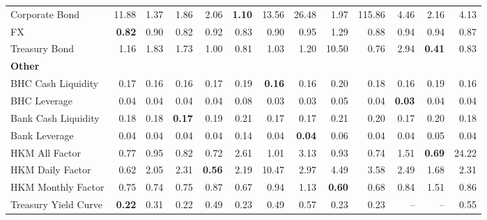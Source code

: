 \begin{table}[htbp]
\begin{tabular}{@{}lrrrrrrrrrrrr@{}}
Corporate Bond & 11.88 & 1.37 & 1.86 & 2.06 & \textbf{1.10} & 13.56 & 26.48 & 1.97 & 115.86 & 4.46 & 2.16 & 4.13 \\
FX & \textbf{0.82} & 0.90 & 0.82 & 0.92 & 0.83 & 0.90 & 0.95 & 1.29 & 0.88 & 0.94 & 0.94 & 0.87 \\
Treasury Bond & 1.16 & 1.83 & 1.73 & 1.00 & 0.81 & 1.03 & 1.20 & 10.50 & 0.76 & 2.94 & \textbf{0.41} & 0.83 \\
\midrule
\multicolumn{13}{l}{\textbf{Other}} \\
BHC Cash Liquidity & 0.17 & 0.16 & 0.16 & 0.17 & 0.19 & \textbf{0.16} & 0.16 & 0.20 & 0.18 & 0.16 & 0.19 & 0.16 \\
BHC Leverage & 0.04 & 0.04 & 0.04 & 0.04 & 0.08 & 0.03 & 0.03 & 0.05 & 0.04 & \textbf{0.03} & 0.04 & 0.04 \\
Bank Cash Liquidity & 0.18 & 0.18 & \textbf{0.17} & 0.19 & 0.21 & 0.17 & 0.17 & 0.21 & 0.20 & 0.17 & 0.20 & 0.18 \\
Bank Leverage & 0.04 & 0.04 & 0.04 & 0.04 & 0.14 & 0.04 & \textbf{0.04} & 0.06 & 0.04 & 0.04 & 0.05 & 0.04 \\
HKM All Factor & 0.77 & 0.95 & 0.82 & 0.72 & 2.61 & 1.01 & 3.13 & 0.93 & 0.74 & 1.51 & \textbf{0.69} & 24.22 \\
HKM Daily Factor & 0.62 & 2.05 & 2.31 & \textbf{0.56} & 2.19 & 10.47 & 2.97 & 4.49 & 3.58 & 2.49 & 1.68 & 2.31 \\
HKM Monthly Factor & 0.75 & 0.74 & 0.75 & 0.87 & 0.67 & 0.94 & 1.13 & \textbf{0.60} & 0.68 & 0.84 & 1.51 & 0.86 \\
Treasury Yield Curve & \textbf{0.22} & 0.31 & 0.22 & 0.49 & 0.23 & 0.49 & 0.57 & 0.23 & 0.23 & -- & -- & 0.55 \\
\bottomrule
\end{tabular}
\vspace{0.1cm}

\end{table}
